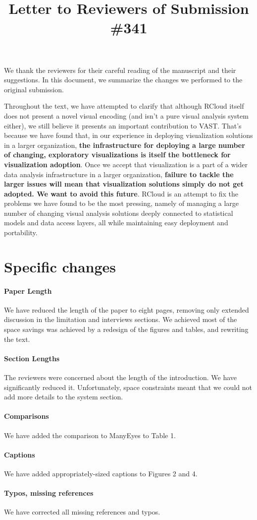 \documentclass{article}
\title{Letter to Reviewers of Submission \#341}
\begin{document}
\maketitle

We thank the reviewers for their careful reading of the manuscript and
their suggestions. In this document, we summarize the changes we
performed to the original submission.

Throughout the text, we have attempted to clarify that although RCloud
itself does not present a novel visual encoding (and isn't a pure
visual analysis system either), we still believe it presents an
important contribution to VAST. That's because we have found that, in
our experience in deploying visualization solutions in a larger
organization, \textbf{the infrastructure for deploying a large number of
  changing, exploratory visualizations is itself the bottleneck for
  visualization adoption}. Once we accept that visualization is a part
of a wider data analysis infrastructure in a larger organization,
\textbf{failure to tackle the larger issues will mean that visualization
solutions simply do not get adopted. We want to avoid this future}.
RCloud is an attempt to fix the problems we have found to be the most
pressing, namely of managing a large number of changing visual
analysis solutions deeply connected to statistical models and data
access layers, all while maintaining easy deployment and portability.

\section*{Specific changes}

\paragraph*{Paper Length} We have reduced the length of the paper
to eight pages, removing only extended discussion in the limitation
and interviews sections. We achieved most of the space savings was
achieved by a redesign of the figures and tables, and rewriting
the text.

\paragraph*{Section Lengths} The reviewers were concerned about the length
of the introduction. We have significantly reduced it. Unfortunately,
space constraints meant that we could not add more details to the
system section.

\paragraph*{Comparisons} We have added the comparison to ManyEyes to Table 1.

\paragraph*{Captions} We have added appropriately-sized captions to Figures 2 and 4.

\paragraph*{Typos, missing references} We have corrected all missing references and typos.
\end{document}
